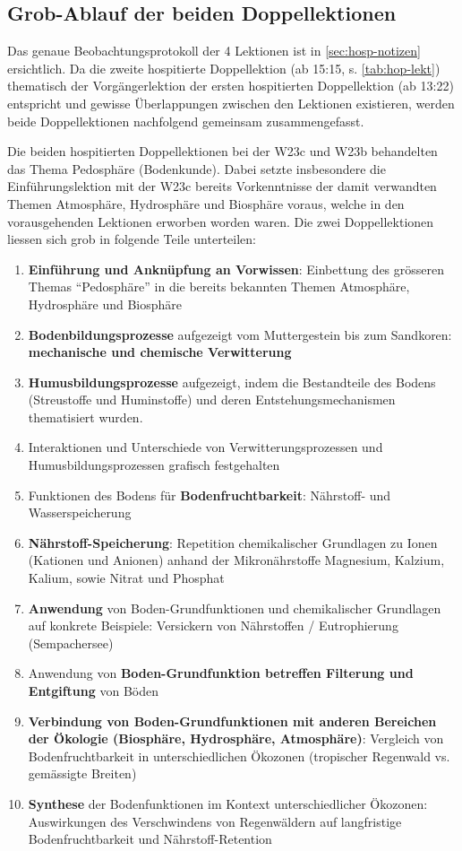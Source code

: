 \subsection{Grob-Ablauf der beiden Doppellektionen}

Das genaue Beobachtungsprotokoll der 4 Lektionen ist in \cref{sec:hosp-notizen} ersichtlich. Da die zweite hospitierte Doppellektion (ab 15:15, s. \cref{tab:hop-lekt}) thematisch der Vorgängerlektion der ersten hospitierten Doppellektion (ab 13:22) entspricht und gewisse Überlappungen zwischen den Lektionen existieren, werden beide Doppellektionen nachfolgend gemeinsam zusammengefasst.

Die beiden hospitierten Doppellektionen bei der W23c und W23b behandelten das Thema Pedosphäre (Bodenkunde). Dabei setzte insbesondere die Einführungslektion mit der W23c bereits Vorkenntnisse der damit verwandten Themen Atmosphäre, Hydrosphäre und Biosphäre voraus, welche in den vorausgehenden Lektionen erworben worden waren. Die zwei Doppellektionen liessen sich grob in folgende Teile unterteilen:

\begin{enumerate}
\item \textbf{Einführung und Anknüpfung an Vorwissen}: Einbettung des grösseren Themas ``Pedosphäre'' in die bereits bekannten Themen Atmosphäre, Hydrosphäre und Biosphäre
\item \textbf{Bodenbildungsprozesse} aufgezeigt vom Muttergestein bis zum Sandkoren: \textbf{mechanische und chemische Verwitterung}
\item \textbf{Humusbildungsprozesse} aufgezeigt, indem die Bestandteile des Bodens (Streustoffe und Huminstoffe) und deren Entstehungsmechanismen thematisiert wurden. 
\item Interaktionen und Unterschiede von Verwitterungsprozessen und Humusbildungsprozessen grafisch festgehalten
\item Funktionen des Bodens für \textbf{Bodenfruchtbarkeit}: Nährstoff- und Wasserspeicherung
\item \textbf{Nährstoff-Speicherung}: Repetition chemikalischer Grundlagen zu Ionen (Kationen und Anionen) anhand der Mikronährstoffe Magnesium, Kalzium, Kalium, sowie Nitrat und Phosphat
\item \textbf{Anwendung }von Boden-Grundfunktionen und chemikalischer Grundlagen auf konkrete Beispiele: Versickern von Nährstoffen / Eutrophierung (Sempachersee)
\item Anwendung von \textbf{Boden-Grundfunktion betreffen Filterung und Entgiftung} von Böden
\item \textbf{Verbindung von Boden-Grundfunktionen mit anderen Bereichen der Ökologie (Biosphäre, Hydrosphäre, Atmosphäre)}: Vergleich von Bodenfruchtbarkeit in unterschiedlichen Ökozonen (tropischer Regenwald vs. gemässigte Breiten)
\item \textbf{Synthese} der Bodenfunktionen im Kontext unterschiedlicher Ökozonen: Auswirkungen des Verschwindens von Regenwäldern auf langfristige Bodenfruchtbarkeit und Nährstoff-Retention
\end{enumerate}

